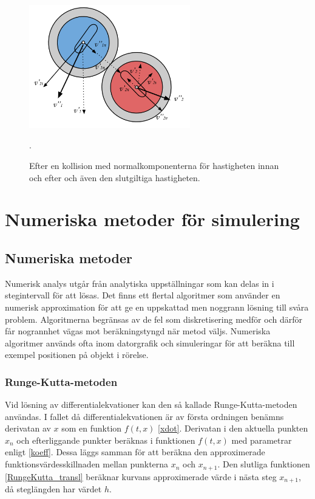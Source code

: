 \documentclass[11pt]{article} %
\begin{document}
\begin{figure}[ht!]
\centering
\includegraphics[width=70mm]{efter-krock.png}
\caption{Efter en kollision med normalkomponenterna för hastigheten innan och efter och även den slutgiltiga hastigheten.  }.
\label{fig:efter-krock}
\label{overflow}
\end{figure}


\section{Numeriska metoder för simulering}

\subsection{Numeriska metoder}
Numerisk analys utgår från analytiska uppställningar som kan delas in i stegintervall för
att lösas. Det finns ett flertal algoritmer som använder en numerisk approximation för
att ge en uppskattad men noggrann lösning till svåra problem. Algoritmerna begränsas
av de fel som diskretisering medför och därför får nogrannhet vägas mot beräkningstyngd
när metod väljs. Numeriska algoritmer används ofta inom datorgrafik och simuleringar
för att beräkna till exempel positionen på objekt i rörelse.

\subsubsection{Runge-Kutta-metoden}
Vid lösning av differentialekvationer kan den så kallade Runge-Kutta-metoden användas.
I fallet då differentialekvationen är av första ordningen benämns derivatan av $x$ som en
funktion $f(t, x)$ \eqref{xdot}. Derivatan i den aktuella punkten $x_n$ och efterliggande punkter
beräknas i funktionen $f(t, x)$ med parametrar enligt \eqref{koeff}. Dessa läggs samman för att
beräkna den approximerade funktionsvärdesskillnaden mellan punkterna $x_n$ och $x_{n+1}$.
Den slutliga funktionen \eqref{RungeKutta_transl} beräknar kurvans approximerade värde i nästa steg $x_{n+1}$,
då steglängden har värdet $h$.
\end{document}
